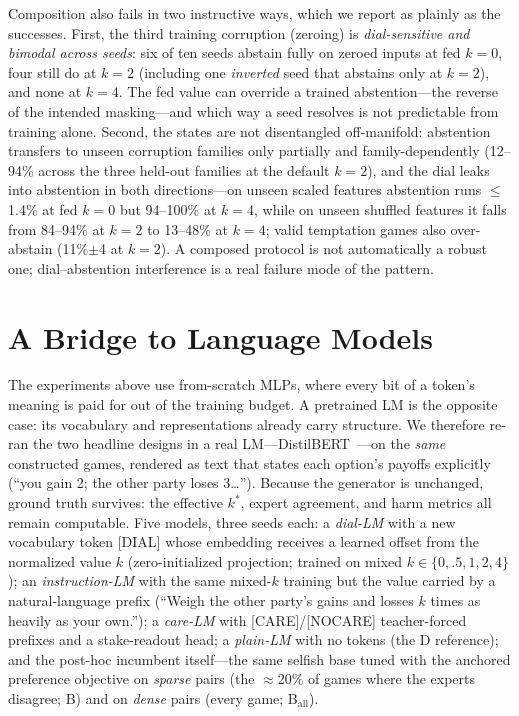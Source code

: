 \documentclass[manuscript, screen, review]{jair}
\begin{document}
Composition also fails in two instructive ways, which we report as plainly as the successes. First, the third training corruption (zeroing) is \emph{dial-sensitive and bimodal across seeds}: six of ten seeds abstain fully on zeroed inputs at fed $k{=}0$, four still do at $k{=}2$ (including one \emph{inverted} seed that abstains only at $k{=}2$), and none at $k{=}4$. The fed value can override a trained abstention---the reverse of the intended masking---and which way a seed resolves is not predictable from training alone. Second, the states are not disentangled off-manifold: abstention transfers to unseen corruption families only partially and family-dependently (12--94\% across the three held-out families at the default $k{=}2$), and the dial leaks into abstention in both directions---on unseen scaled features abstention runs $\leq$1.4\% at fed $k{=}0$ but 94--100\% at $k{=}4$, while on unseen shuffled features it falls from 84--94\% at $k{=}2$ to 13--48\% at $k{=}4$; valid temptation games also over-abstain (11\%$\pm$4 at $k{=}2$). A composed protocol is not automatically a robust one; dial--abstention interference is a real failure mode of the pattern.

\section{A Bridge to Language Models}
\label{sec:bridge}

The experiments above use from-scratch MLPs, where every bit of a token's meaning is paid for out of the training budget. A pretrained LM is the opposite case: its vocabulary and representations already carry structure. We therefore re-ran the two headline designs in a real LM---DistilBERT~\citep{sanh2019distilbert}---on the \emph{same} constructed games, rendered as text that states each option's payoffs explicitly (``you gain 2; the other party loses 3\ldots''). Because the generator is unchanged, ground truth survives: the effective $k^*$, expert agreement, and harm metrics all remain computable. Five models, three seeds each: a \emph{dial-LM} with a new vocabulary token [DIAL] whose embedding receives a learned offset from the normalized value $k$ (zero-initialized projection; trained on mixed $k \in \{0,.5,1,2,4\}$); an \emph{instruction-LM} with the same mixed-$k$ training but the value carried by a natural-language prefix (``Weigh the other party's gains and losses $k$ times as heavily as your own.''); a \emph{care-LM} with [CARE]/[NOCARE] teacher-forced prefixes and a stake-readout head; a \emph{plain-LM} with no tokens (the D reference); and the post-hoc incumbent itself---the same selfish base tuned with the anchored preference objective on \emph{sparse} pairs (the $\approx$20\% of games where the experts disagree; B) and on \emph{dense} pairs (every game; B$_{\mathrm{all}}$).
\end{document}
